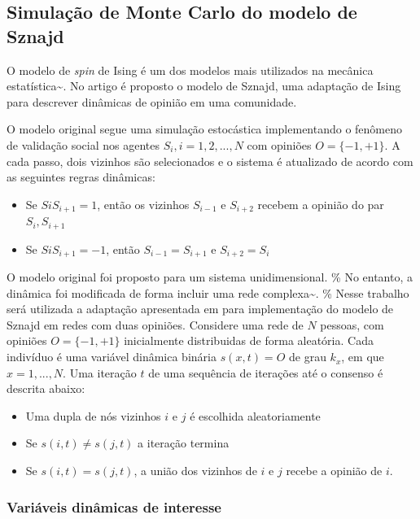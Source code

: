 \subsection{Simulação de Monte Carlo do modelo de
Sznajd}\label{simulauxe7uxe3o-de-monte-carlo-do-modelo-de-sznajd}

O modelo de \emph{spin} de Ising é um dos modelos mais utilizados na
mecânica estatística\textasciitilde{}\cite{castellano2009social}. No
artigo \cite{sznajd2000opinion} é proposto o modelo de Sznajd, uma
adaptação de Ising para descrever dinâmicas de opinião em uma
comunidade.

O modelo original segue uma simulação estocástica implementando o
fenômeno de validação social nos agentes \(S_i, i=1,2,...,N\) com
opiniões \(O=\{-1, +1\}\). A cada passo, dois vizinhos são selecionados
e o sistema é atualizado de acordo com as seguintes regras dinâmicas:

\begin{itemize}
\tightlist
\item
  Se \(SiS_{i+1}=1\), então os vizinhos \(S_{i-1}\) e \(S_{i+2}\)
  recebem a opinião do par \(S_i, S_{i+1}\)
\item
  Se \(SiS_{i+1}=-1\), então \(S_{i-1}=S_{i+1}\) e \(S_{i+2}=S_i\)
\end{itemize}

O modelo original foi proposto para um sistema unidimensional. \% No
entanto, a dinâmica foi modificada de forma incluir uma rede
complexa\textasciitilde{}\cite{sanchez2004sznajd}. \% Nesse trabalho
será utilizada a adaptação apresentada em \cite{Bernardes_2002} para
implementação do modelo de Sznajd em redes com duas opiniões. Considere
uma rede de \(N\) pessoas, com opiniões \(O =\{-1, +1\}\) inicialmente
distribuidas de forma aleatória. Cada indivíduo é uma variável dinâmica
binária \(s(x, t)=O\) de grau \(k_x\), em que \(x=1,...,N\). Uma
iteração \(t\) de uma sequência de iterações até o consenso é descrita
abaixo:

\begin{itemize}
\tightlist
\item
  Uma dupla de nós vizinhos \(i\) e \(j\) é escolhida aleatoriamente
\item
  Se \(s(i, t) \ne s(j, t)\) a iteração termina
\item
  Se \(s(i, t) = s(j, t)\), a união dos vizinhos de \(i\) e \(j\) recebe
  a opinião de \(i\).
\end{itemize}

\subsubsection{Variáveis dinâmicas de
interesse}\label{variuxe1veis-dinuxe2micas-de-interesse}

